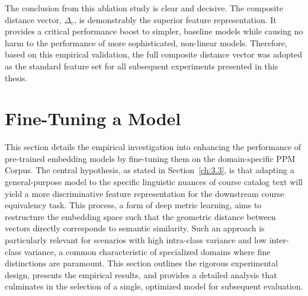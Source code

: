 The conclusion from this ablation study is clear and decisive. The composite distance vector, \(\Delta_c\), is demonstrably the superior feature representation. It provides a critical performance boost to simpler, baseline models while causing no harm to the performance of more sophisticated, non-linear models. Therefore, based on this empirical validation, the full composite distance vector was adopted as the standard feature set for all subsequent experiments presented in this thesis.

\section{Fine-Tuning a Model}
This section details the empirical investigation into enhancing the performance of pre-trained embedding models by fine-tuning them on the domain-specific PPM Corpus. The central hypothesis, as stated in Section~\ref{ch:3.3}, is that adapting a general-purpose model to the specific linguistic nuances of course catalog text will yield a more discriminative feature representation for the downstream course equivalency task. This process, a form of deep metric learning, aims to restructure the embedding space such that the geometric distance between vectors directly corresponds to semantic similarity. Such an approach is particularly relevant for scenarios with high intra-class variance and low inter-class variance, a common characteristic of specialized domains where fine distinctions are paramount. This section outlines the rigorous experimental design, presents the empirical results, and provides a detailed analysis that culminates in the selection of a single, optimized model for subsequent evaluation.

